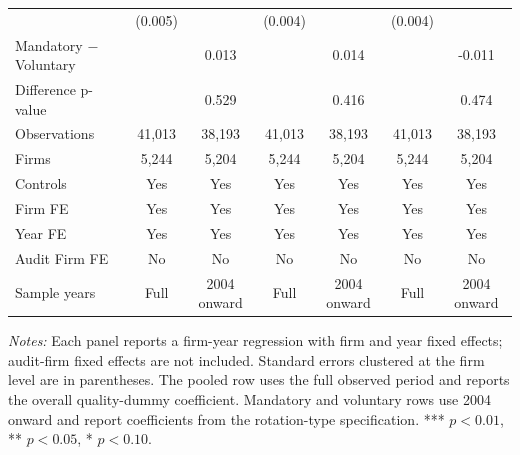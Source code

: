 \begin{table}[htbp]
\begin{threeparttable}
{\begin{tabular}{l cc cc cc}
 & (0.005) &  & (0.004) &  & (0.004) &  \\
Mandatory $-$ Voluntary &  & 0.013 &  & 0.014 &  & -0.011 \\
Difference p-value &  & 0.529 &  & 0.416 &  & 0.474 \\
Observations & 41,013 & 38,193 & 41,013 & 38,193 & 41,013 & 38,193 \\
Firms & 5,244 & 5,204 & 5,244 & 5,204 & 5,244 & 5,204 \\
\midrule
Controls & Yes & Yes & Yes & Yes & Yes & Yes \\
Firm FE & Yes & Yes & Yes & Yes & Yes & Yes \\
Year FE & Yes & Yes & Yes & Yes & Yes & Yes \\
Audit Firm FE & No & No & No & No & No & No \\
Sample years & Full & 2004 onward & Full & 2004 onward & Full & 2004 onward \\
\bottomrule
\end{tabular}}
\begin{tablenotes}\footnotesize
\item \textit{Notes:} Each panel reports a firm-year regression with firm and year fixed effects; audit-firm fixed effects are not included. Standard errors clustered at the firm level are in parentheses. The pooled row uses the full observed period and reports the overall quality-dummy coefficient. Mandatory and voluntary rows use 2004 onward and report coefficients from the rotation-type specification. *** \(p<0.01\), ** \(p<0.05\), * \(p<0.10\).
\end{tablenotes}
\end{threeparttable}
\end{table}
